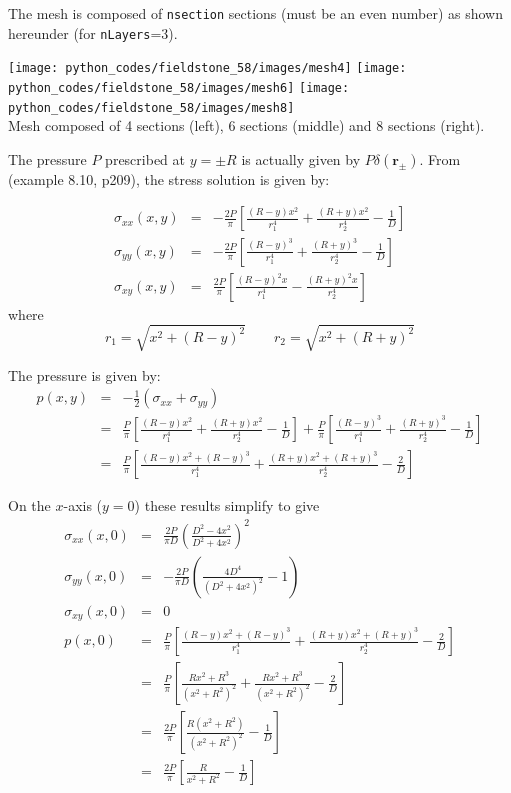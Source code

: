 The mesh is composed of {\tt nsection} sections (must be an even number)
as shown hereunder (for {\tt nLayers}=3). 
\begin{center}
\texttt{[image: python\_codes/fieldstone\_58/images/mesh4]}
\texttt{[image: python\_codes/fieldstone\_58/images/mesh6]}
\texttt{[image: python\_codes/fieldstone\_58/images/mesh8]}\\
{\captionfont Mesh composed of 4 sections (left), 6 sections (middle) and 8 sections (right).}
\end{center}

The pressure $P$ prescribed at $y=\pm R$ is actually given by $P \delta({\bm r_\pm})$. 
From \cite{sadd14} (example 8.10, p209), the stress solution is given by:

\begin{eqnarray}
\sigma_{xx}(x,y)&=& -\frac{2P}{\pi}\left[\frac{(R-y)x^2}{r_1^4} + \frac{(R+y)x^2}{r_2^4} -\frac{1}{D} \right] \\
\sigma_{yy}(x,y)&=& -\frac{2P}{\pi}\left[\frac{(R-y)^3}{r_1^4} + \frac{(R+y)^3}{r_2^4} -\frac{1}{D} \right] \\
\sigma_{xy}(x,y)&=&  \frac{2P}{\pi}\left[\frac{(R-y)^2 x}{r_1^4} - \frac{(R+y)^2x}{r_2^4}  \right]
\end{eqnarray}
where 
\[
r_1=\sqrt{x^2 + (R-y)^2}
\quad\quad
r_2=\sqrt{x^2 + (R+y)^2}
\]

The pressure is given by:
\begin{eqnarray}
p(x,y) 
&=& -\frac{1}{2}(\sigma_{xx} + \sigma_{yy}) \nonumber\\
&=& 
 \frac{P}{\pi} \left[ \frac{(R-y)x^2}{r_1^4} + \frac{(R+y)x^2}{r_2^4} -\frac{1}{D} \right] 
+ \frac{P}{\pi} \left[ \frac{(R-y)^3}{r_1^4} + \frac{(R+y)^3}{r_2^4} -\frac{1}{D} \right] \\
&=& 
\frac{P}{\pi} \left[ \frac{(R-y)x^2 + (R-y)^3 }{r_1^4} + \frac{(R+y)x^2 + (R+y)^3}{r_2^4} - \frac{2}{D}\right] 
\end{eqnarray}

On the $x$-axis ($y=0$) these results simplify to give
\begin{eqnarray}
\sigma_{xx}(x,0) &=& \frac{2P}{\pi D} \left( \frac{D^2-4x^2}{D^2+4x^2}  \right)^2 \\
\sigma_{yy}(x,0) &=& -\frac{2P}{\pi D} \left( \frac{4D^4}{(D^2+4x^2)^2} -1 \right) \\
\sigma_{xy}(x,0) &=& 0 \\
p(x,0) 
&=& \frac{P}{\pi} \left[ \frac{(R-y)x^2 + (R-y)^3 }{r_1^4} + \frac{(R+y)x^2 + (R+y)^3  }{r_2^4}  - \frac{2}{D} \right] \\
&=& \frac{P}{\pi} \left[ \frac{Rx^2 + R^3 }{(x^2+R^2)^2} + \frac{Rx^2 + R^3  }{(x^2+R^2)^2}  - \frac{2}{D} \right] \\
&=& \frac{2P}{\pi} \left[ \frac{R(x^2 + R^2 )}{(x^2+R^2)^2} - \frac{1}{D} \right] \\
&=& \frac{2P}{\pi} \left[ \frac{R }{x^2+R^2} - \frac{1}{D} \right] \\
\end{eqnarray}

